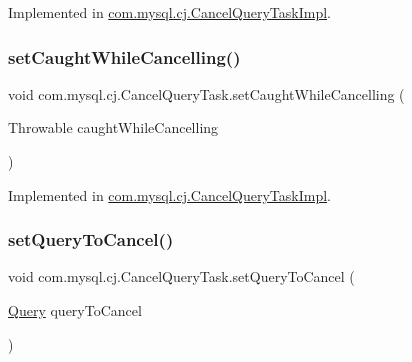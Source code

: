 Implemented in \mbox{\hyperlink{classcom_1_1mysql_1_1cj_1_1_cancel_query_task_impl_ac478b7b9bd6ffb2803fbaf31d5e28943}{com.\+mysql.\+cj.\+Cancel\+Query\+Task\+Impl}}.

\mbox{\label{interfacecom_1_1mysql_1_1cj_1_1_cancel_query_task_aacd2c076a44dd83a7d4140278ae9d0b9}} 
\subsubsection{\texorpdfstring{set\+Caught\+While\+Cancelling()}{setCaughtWhileCancelling()}}
{\footnotesize\ttfamily void com.\+mysql.\+cj.\+Cancel\+Query\+Task.\+set\+Caught\+While\+Cancelling (\begin{DoxyParamCaption}\item[{Throwable}]{caught\+While\+Cancelling }\end{DoxyParamCaption})}



Implemented in \mbox{\hyperlink{classcom_1_1mysql_1_1cj_1_1_cancel_query_task_impl_a6ed7124ec0547111f98f3d9c32c0046f}{com.\+mysql.\+cj.\+Cancel\+Query\+Task\+Impl}}.

\mbox{\label{interfacecom_1_1mysql_1_1cj_1_1_cancel_query_task_ab9f6e0f8efcfd3f4b275bb1eb927b933}} 
\subsubsection{\texorpdfstring{set\+Query\+To\+Cancel()}{setQueryToCancel()}}
{\footnotesize\ttfamily void com.\+mysql.\+cj.\+Cancel\+Query\+Task.\+set\+Query\+To\+Cancel (\begin{DoxyParamCaption}\item[{\mbox{\hyperlink{interfacecom_1_1mysql_1_1cj_1_1_query}{Query}}}]{query\+To\+Cancel }\end{DoxyParamCaption})}



